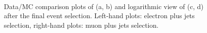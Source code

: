 \begin{figure}[htbp]
  	 \\
    \caption{Data/MC comparison plots of \MET (a, b) and logarithmic view of \MET (c, d) after the final event
    selection. Left-hand plots: electron plus jets selection, right-hand plots: muon plus jets selection.}
    \label{fig:contol_plots_METs}
\end{figure}

